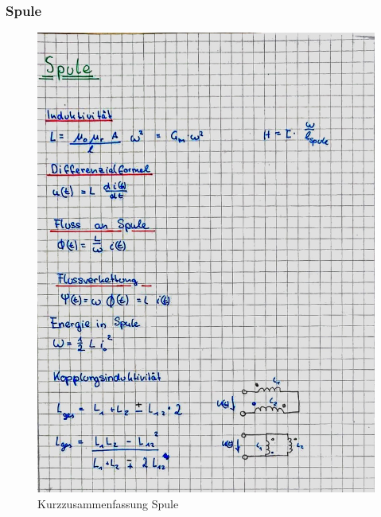 \documentclass[12pt,a4paper]{article}%
\numberwithin{equation}{section}
\numberwithin{equation}{subsection}
\begin{document}
  \subsubsection{Spule}
\begin{figure}[H] 
	  \centering
	  \includegraphics[width=1\textwidth]{5_Spule.jpg}
	  \caption{Kurzzusammenfassung Spule}
	  \label{fig:Spule}
  \end{figure}
  \newpage
\end{document}
